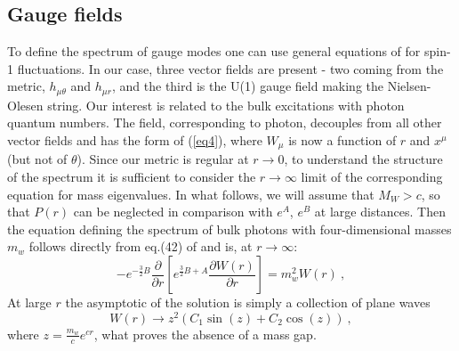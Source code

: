 \documentclass[a4paper,12pt]{article}
\begin{document}
\subsection{Gauge fields}
To define the spectrum of gauge modes one can use general equations 
of \cite{Randjbar-Daemi:2002pq} for spin-1 fluctuations. In our case,
three vector fields are present - two coming from the metric,
$h_{\mu\theta}$ and $h_{\mu r}$, and the third is the U(1) gauge
field making the Nielsen-Olesen string. Our interest is related to the bulk
excitations with photon quantum numbers.  The field, corresponding to
photon, decouples from all other vector fields and has the form of
(\ref{eq4}), where $W_\mu$ is now a function of $r$ and $x^\mu$ (but
not of $\theta$). Since our metric is regular at $r \to 0$, to
understand the structure of the spectrum it is sufficient to consider
the $r\rightarrow \infty$ limit of the corresponding equation for mass
eigenvalues.  In what follows, we will assume that $M_W > c$, so that
$P(r)$ can be neglected in comparison with $e^A$, $e^B$ at large
distances. Then the equation defining the spectrum of bulk photons with
four-dimensional masses $m_w$ follows directly from eq.(42) of 
\cite{Randjbar-Daemi:2002pq} and is, at $r \to \infty$:
\begin{equation}
-e^{-\frac{3}{2}B}\frac{\partial}{\partial r}
\left[e^{\frac{3}{2}B+A}\frac{\partial
W(r)}{\partial r}\right] = m_w^2 W(r)~,
\end{equation}
At large $r$ the asymptotic of the solution is simply a collection of
plane waves
\begin{equation}
W(r) \to z^2 \left(C_1 \sin(z) + C_2 \cos(z)\right)~,
\end{equation}
where $z=\frac{m_w}{c} e^{cr}$, what proves the absence of a mass gap.
\end{document}
